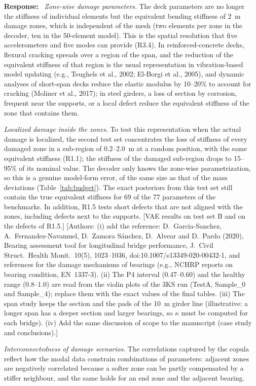 \documentclass[11pt]{article}
\newenvironment{response}{\par\smallskip\noindent\color{resp}\textbf{Response:}\ }{\par}
\newcommand{\authornote}[1]{\textcolor{note}{\textsf{[Authors: #1]}}}
\newcommand{\tbd}[1]{\textcolor{note}{\textsf{[#1]}}}
\begin{document}
\begin{response}
\textit{Zone-wise damage parameters.} The deck parameters are no longer the stiffness of individual elements but the
equivalent bending stiffness of 2~m damage zones, which is independent of the mesh (two elements per zone in the
decoder, ten in the 50-element model). This is the spatial resolution that five accelerometers and five modes can
provide (R3.4). In reinforced-concrete decks, flexural cracking spreads over a region of the span, and the reduction of
the equivalent stiffness of that region is the usual representation in vibration-based model updating (e.g., Teughels
et al., 2002; El-Borgi et al., 2005), and dynamic analyses of short-span decks reduce the elastic modulus by 10--20\% to
account for cracking (Moliner et al., 2017); in steel girders, a loss of section by corrosion, frequent near the supports, or a local defect reduce
the equivalent stiffness of the zone that contains them.

\textit{Localized damage inside the zones.} To test this representation when the actual damage is localized, the second
test set concentrates the loss of stiffness of every damaged zone in a sub-region of 0.2--2.0~m at a random position,
with the same equivalent stiffness (R1.1); the stiffness of the damaged sub-region drops to 15--95\% of its nominal value.
The decoder only knows the zone-wise parametrization, so this is a genuine model-form error, of the same size as that of
the mass deviations (Table~\ref{tab:budget}). The exact posteriors from this test set still contain the true equivalent
stiffness for 69 of the 77 parameters of the benchmarks. In addition, R1.5 tests short defects that are not aligned with
the zones, including defects next to the supports.
\tbd{VAE results on test set B and on the defects of R1.5.}
\authornote{(i) add the reference: D.~Garcia-Sanchez, A.~Fernandez-Navamuel, D.~Zamora S\'anchez, D.~Alvear and
D.~Pardo (2020), Bearing assessment tool for longitudinal bridge performance, J.\ Civil Struct.\ Health Monit.\ 10(5),
1023--1036, doi:10.1007/s13349-020-00432-1, and references for the damage mechanisms of bearings (e.g., NCHRP reports on
bearing condition, EN~1337-3). (ii) The P4 interval (0.47--0.60) and the healthy range (0.8--1.0) are read from the
violin plots of the 3KS run (TestA, Sample\_0 and Sample\_4); replace them with the exact values of the final tables.
(iii) The span study keeps the section and the pads of the 10~m girder line (illustrative: a longer span has a deeper
section and larger bearings, so $\kappa$ must be computed for each bridge). (iv) Add the same discussion of scope to the manuscript (case study and conclusions).}

\textit{Interconnectedness of damage scenarios.} The correlations captured by the copula reflect how the modal data
constrain combinations of parameters: adjacent zones are negatively correlated because a softer zone can be partly
compensated by a stiffer neighbour, and the same holds for an end zone and the adjacent bearing.
\end{response}
\end{document}
